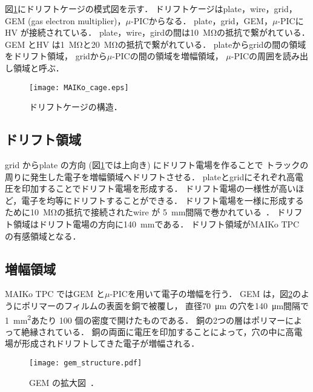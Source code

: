 \documentclass[../master]{subfiles}
\begin{document}
図\ref{fig::MAIKo_cage}にドリフトケージの模式図を示す．
ドリフトケージはplate，wire，grid，GEM (gas electron multiplier)，$\mu$-PICからなる．
plate，grid，GEM，$\mu$-PICにHV が接続されている．
plate，wire，girdの間は\SI{10}{\mega\ohm}の抵抗で繋がれている．
GEM とHV は\SI{1}{\mega\ohm}と\SI{20}{\mega\ohm}の抵抗で繋がれている．
plateからgridの間の領域をドリフト領域，
gridから$\mu$-PICの間の領域を増幅領域，
$\mu$-PICの周囲を読み出し領域と呼ぶ．
\begin{figure}
  \centering
  \texttt{[image: MAIKo\_cage.eps]}
  \caption{ドリフトケージの構造．}
  \label{fig::MAIKo_cage}
\end{figure}


\subsection{ドリフト領域}
grid からplate の方向 (図\ref{fig::MAIKo_cage}では上向き) にドリフト電場を作ることで
トラックの周りに発生した電子を増幅領域へドリフトさせる．
plateとgridにそれぞれ高電圧を印加することでドリフト電場を形成する．
ドリフト電場の一様性が高いほど，電子を均等にドリフトすることができる．
ドリフト電場を一様に形成するために\SI{10}{\mega\ohm}の抵抗で接続されたwire が
\SI{5}{\milli\metre}間隔で巻かれている~\cite{furuno}．
ドリフト領域はドリフト電場の方向に\SI{140}{\milli\metre}である．
ドリフト領域がMAIKo TPC の有感領域となる．

\subsection{増幅領域}
MAIKo TPC ではGEM と$\mu$-PICを用いて電子の増幅を行う．
GEM は，図\ref{pic::GEM}のようにポリマーのフィルムの表面を銅で被覆し，
直径\SI{70}{\micro\metre} の穴を\SI{140}{\micro\metre}間隔で\SI{1}{\square\milli\metre}あたり
100 個の密度で開けたものである．
銅の2つの層はポリマーによって絶縁されている．
銅の両面に電圧を印加することによって，穴の中に高電場が形成されドリフトしてきた電子が増幅される．
\begin{figure}
  \centering
  \texttt{[image: gem\_structure.pdf]}
  \caption{GEM の拡大図~\cite{gem_compass}．}
  \label{pic::GEM}  
\end{figure}
\end{document}
